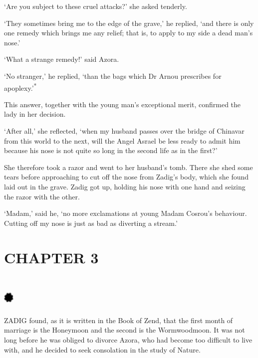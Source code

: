 \documentclass{article}
\begin{document}
\begin{center}
`Are you subject to these cruel attacks?' she asked tenderly. 

`They sometimes bring me to the edge of the grave,' he replied, `and there is only 
one remedy which brings me any relief; that is, to apply to my side a dead man's 
nose.' 

`What a strange remedy!' said Azora. 

`No stranger,' he replied, `than the bags which Dr Arnou prescribes for apoplexy.'\textsuperscript{* 
}

This answer, together with the young man's exceptional merit, confirmed the lady 
in her decision. 

`After all,' she reflected, `when my husband passes over the bridge of Chinavar 
from this world to the next, will the Angel Asrael be less ready to admit him because 
his nose is not quite so long in the second life as in the first?' 

She therefore took a razor and went to her husband's tomb. There she shed some 
tears before approaching to cut off the nose from Zadig's body, which she found 
laid out in the grave. Zadig got up, holding his nose with one hand and seizing 
the razor with the other. 

`Madam,' said he, `no more exclamations at young Madam Cosrou's behaviour. Cutting 
off my nose is just as bad as diverting a stream.'\pagebreak{} 

\section*{\textbf{CHAPTER 3  }}

\section*{%
\includegraphics[width=14pt, height=15pt, keepaspectratio=true]{Zadig or L'Ingenu - Voltaire-fig006.jpg}
}

 

ZADIG found, as it is written in the Book of Zend, that the first month of marriage 
is the Honeymoon and the second is the Wormwoodmoon. It was not long before he 
was obliged to divorce Azora, who had become too difficult to live with, and he 
decided to seek consolation in the study of Nature. 


\end{center}
\end{document}
